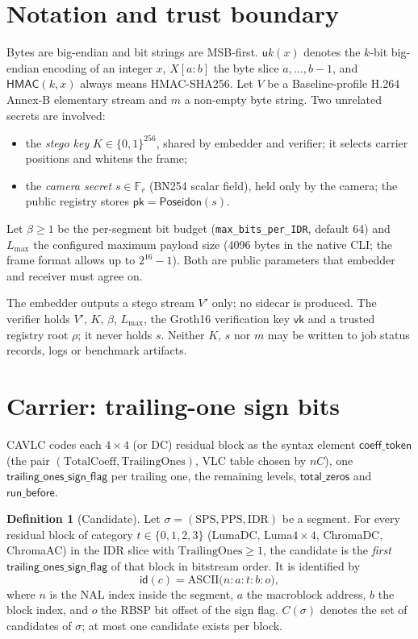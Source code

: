 \documentclass[11pt,a4paper]{article}
\theoremstyle{definition}
\newtheorem{definition}{Definition}
\theoremstyle{remark}
\newcommand{\HMAC}{\mathsf{HMAC}}
\newcommand{\Pos}{\mathsf{Poseidon}}
\newcommand{\id}{\mathsf{id}}
\begin{document}
\section{Notation and trust boundary}
Bytes are big-endian and bit strings are MSB-first. $\mathsf{u}k(x)$ denotes
the $k$-bit big-endian encoding of an integer $x$, $X[a{:}b]$ the byte slice
$a,\ldots,b-1$, and $\HMAC(k,x)$ always means HMAC-SHA256. Let $V$ be a
Baseline-profile H.264 Annex-B elementary stream and $m$ a non-empty byte
string. Two unrelated secrets are involved:
\begin{itemize}
\item the \emph{stego key} $K\in\{0,1\}^{256}$, shared by embedder and
verifier; it selects carrier positions and whitens the frame;
\item the \emph{camera secret} $s\in\mathbb{F}_r$ (BN254 scalar field), held
only by the camera; the public registry stores $\mathsf{pk}=\Pos(s)$.
\end{itemize}
Let $\beta\ge 1$ be the per-segment bit budget (\texttt{max\_bits\_per\_IDR},
default 64) and $L_{\max}$ the configured maximum payload size (4096 bytes in
the native CLI; the frame format allows up to $2^{16}-1$). Both are public
parameters that embedder and receiver must agree on.

The embedder outputs a stego stream $V'$ only; no sidecar is produced. The
verifier holds $V'$, $K$, $\beta$, $L_{\max}$, the Groth16 verification key
$\mathsf{vk}$ and a trusted registry root $\rho$; it never holds $s$. Neither
$K$, $s$ nor $m$ may be written to job status records, logs or benchmark
artifacts.

\section{Carrier: trailing-one sign bits}
CAVLC codes each $4\times4$ (or DC) residual block as the syntax element
$\mathsf{coeff\_token}$ (the pair $(\mathrm{TotalCoeff},\mathrm{TrailingOnes})$,
VLC table chosen by $nC$), one $\mathsf{trailing\_ones\_sign\_flag}$ per
trailing one, the remaining levels, $\mathsf{total\_zeros}$ and
$\mathsf{run\_before}$.

\begin{definition}[Candidate]
Let $\sigma=(\mathrm{SPS},\mathrm{PPS},\mathrm{IDR})$ be a segment. For every
residual block of category $t\in\{0,1,2,3\}$ (LumaDC, Luma$4{\times}4$,
ChromaDC, ChromaAC) in the IDR slice with $\mathrm{TrailingOnes}\ge1$, the
candidate is the \emph{first} $\mathsf{trailing\_ones\_sign\_flag}$ of that
block in bitstream order. It is identified by
\[
\id(c)=\text{ASCII}\bigl(n:a:t:b:o\bigr),
\]
where $n$ is the NAL index inside the segment, $a$ the macroblock address, $b$
the block index, and $o$ the RBSP bit offset of the sign flag. $C(\sigma)$
denotes the set of candidates of $\sigma$; at most one candidate exists per
block.
\end{definition}
\end{document}
